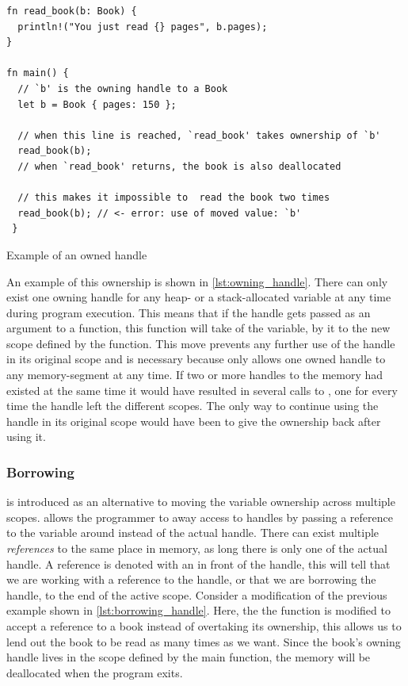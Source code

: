 \begin{listing}[tb]
\begin{verbatim}
fn read_book(b: Book) {
  println!("You just read {} pages", b.pages);
}

fn main() {
  // `b' is the owning handle to a Book
  let b = Book { pages: 150 };

  // when this line is reached, `read_book' takes ownership of `b'
  read_book(b);
  // when `read_book' returns, the book is also deallocated

  // this makes it impossible to  read the book two times
  read_book(b); // <- error: use of moved value: `b'
 }
\end{verbatim}
\caption{Example of an owned handle}
\label{lst:owning_handle}
\end{listing}

An example of this ownership is shown in \autoref{lst:owning_handle}.
There can only exist one owning handle for any heap- or a stack-allocated variable at any time during program execution.
This means that if the handle gets passed as an argument to a function, this function will take  of the variable, by  it to the new scope defined by the function.
This move prevents any further use of the handle in its original scope and is necessary because {\rust} only allows one owned handle to any memory-segment at any time.
If two or more handles to the memory had existed at the same time it would have resulted in several calls to , one for every time the handle left the different scopes.
The only way to continue using the handle in its original scope would have been to give the ownership back after using it.

\subsubsection{Borrowing}
\label{ssec:borrowing}

 is introduced as an alternative to moving the variable ownership across multiple scopes.
\rust allows the programmer to  away access to handles by passing a reference to the variable around instead of the actual handle.
There can exist multiple \emph{references} to the same place in memory, as long there is only one  of the actual handle.
A reference is denoted with an \code{\&} in front of the handle, this will tell {\rust} that we are working with a reference to the handle, or that we are borrowing the handle, to the end of the active scope.
Consider a modification of the previous example shown in \autoref{lst:borrowing_handle}.
Here, the the  function is modified to accept a reference to a book instead of overtaking its ownership, this allows us to lend out the book to be read as many times as we want.
Since the book's owning handle lives in the scope defined by the main function, the memory will be deallocated when the program exits.

